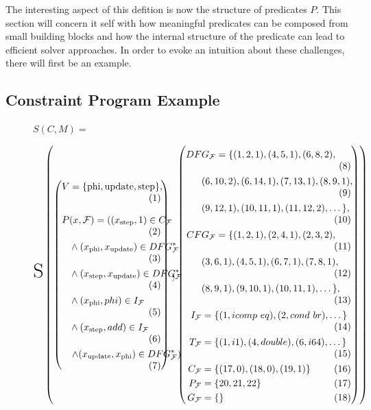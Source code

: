     The interesting aspect of this defition is now the structure of predicates
    $P$.
    This section will concern it self with how meaningful predicates can be
    composed from small building blocks and how the internal structure of the
    predicate can lead to efficient solver approaches.
    In order to evoke an intuition about these challenges, there will first be
    an example.

\subsection{Constraint Program Example}

\begin{figure}[t]
\centering
{\huge $S\left(C,M\right)=$}
\vspace{0.5em}

$\text{\huge S}\left(\left(
\begin{minipage}{0.3\textwidth}
\setlength{\abovedisplayskip}{0pt}
\begin{align*}
    V=\{\text{phi}, \text{update}, \text{step}\},
\end{align*}
\begin{align*}
    P&(x,\mathcal F)=\left((x_\text{step},1)\in C_\mathcal{F}\right.\\
    &\land(x_\text{phi},x_\text{update})\in DFG_\mathcal{F}^*\\
    &\land(x_\text{step},x_\text{update})\in DFG_\mathcal{F}^*\\
    &\land(x_\text{phi}, phi)\in I_\mathcal{F}\\
    &\land(x_\text{step}, add)\in I_\mathcal{F}\\
    &\left.\land(x_\text{update},x_\text{phi})\in DFG_\mathcal{F}^*\right)
\end{align*}
\end{minipage}
\right)\text{\huge ,}\left(
\begin{minipage}{0.5\textwidth}
\setlength{\abovedisplayskip}{0pt}
\begin{align*}
DF&G_\mathcal F=\{(1,2,1),(4,5,1),(6,8,2),\\
&(6,10,2),(6,14,1),(7,13,1),(8,9,1),\\
&(9,12,1),(10,11,1),(11,12,2),\dots\},\\
CF&G_\mathcal F=\{(1,2,1),(2,4,1),(2,3,2),\\
&(3,6,1),(4,5,1),(6,7,1),(7,8,1),\\
&(8,9,1),(9,10,1),(10,11,1),\dots\},\\
I_\mathcal F&{}=\{(1,icomp\ eq),(2,cond\ br),\dots\}\\
T_\mathcal F&{}=\{(1,i1),(4,double),(6,i64),\dots\}\\
C_\mathcal F&{}=\{(17,0),(18,0),(19,1)\}\\
P_\mathcal F&{}=\{20,21,22\}\\
G_\mathcal F&{}=\{\}
\end{align*}
\end{minipage}
\right)\right)$


\end{figure}
